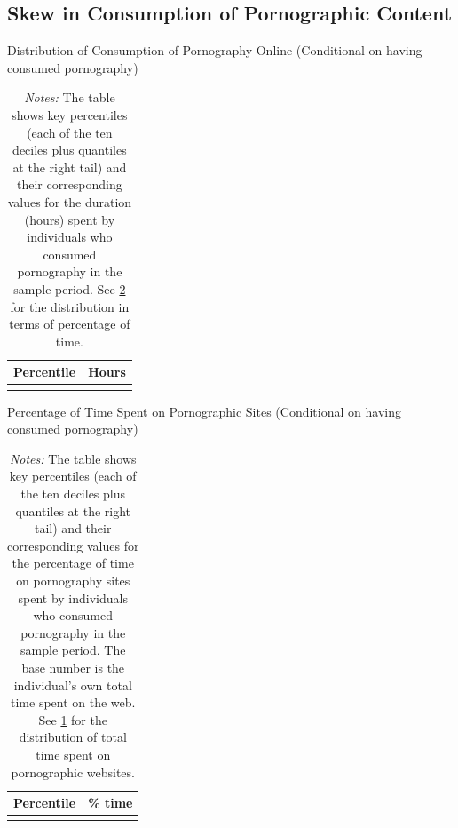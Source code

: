 \documentclass[12pt, letterpaper]{article}
\begin{document}
\FloatBarrier
\subsection{Skew in Consumption of Pornographic Content}
\begin{table}[ht] \centering \small \setlength\tabcolsep{10 pt}
	\caption{Distribution of Consumption of Pornography Online (Conditional on having consumed pornography)}
	\label{tab:distribution_duration}
	\begin{adjustbox}{max width=\textwidth}
		\begin{tabular}{cr}
			\toprule
			\multicolumn{1}{c}{\textbf{Percentile}}&\multicolumn{1}{c}{\textbf{Hours}}\\
			\midrule
			\\
			\bottomrule
		\end{tabular}
	\end{adjustbox}
	\caption*{\footnotesize \emph{Notes:} 
		The table shows key percentiles (each of the ten deciles plus quantiles at the right tail) and their corresponding values for the duration (hours) spent by individuals who consumed pornography in the sample period. 
		See \cref{tab:distribution_prop_duration} for the distribution in terms of percentage of time.
	}
\end{table}

\begin{table}[ht] \centering \small \setlength\tabcolsep{10 pt}
	\caption{Percentage of Time Spent on Pornographic Sites (Conditional on having consumed pornography)}
	\label{tab:distribution_prop_duration}
	\begin{adjustbox}{max width=\textwidth}
		\begin{tabular}{cr}
			\toprule
			\multicolumn{1}{c}{\textbf{Percentile}}&\multicolumn{1}{c}{\textbf{\% time}}\\
			\midrule
			\\
			\bottomrule
		\end{tabular}
	\end{adjustbox}
	\caption*{\footnotesize \emph{Notes:} The table shows key percentiles (each of the ten deciles plus quantiles at the right tail) and their corresponding values for the percentage of time on pornography sites spent by individuals who consumed pornography in the sample period. The base number is the individual's own total time spent on the web. See \cref{tab:distribution_duration} for the distribution of total time spent on pornographic websites.}
\end{table}
\end{document}
